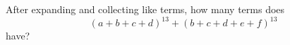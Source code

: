 After expanding and collecting like terms, how many terms does
\[(a+b+c+d)^{13}+(b+c+d+e+f)^{13}\]
have?
